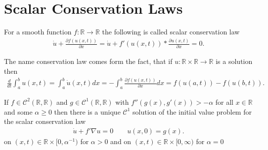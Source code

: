 \section{Scalar Conservation Laws}
\begin{definition}
 For a smooth function $f : \mathbb{R} \to \mathbb{R}$  the following is called scalar conservation law 
 \begin{align*}
  \dot{u} + \frac{\partial f(u(x,t))}{\partial x}   = \dot{u} + f'(u(x,t)) *\frac{\partial u(x,t )}{\partial x}  = 0
 .\end{align*}
\end{definition}
\begin{corollary}
 The name conservation law comes form the fact, that if $u : \mathbb{R} \times  \mathbb{R} \to  \mathbb{R}$   is a solution then 
 \begin{align*}
  \frac{d}{dt} \int_a^{b} u(x,t)  = \int_a^{b} \dot{u}(x,t) dx = -\int_a^{b} \frac{\partial f(u(x,t))}{\partial x}   dx = f(u(a,t)) - f(u(b,t)) 
 .\end{align*}
\end{corollary}
\begin{Theorem}[1.4]
 If $f \in  \mathcal{C}^{2}(\mathbb{R},\mathbb{R}) $  and $g \in  \mathcal{C}^{1}(\mathbb{R},\mathbb{R}) $ with $f''(g(x),g'(x)) > - \alpha $ for all $x \in  \mathbb{R}$
 and some $\alpha  \ge 0$ then there is a unique $\mathcal{C}^{1} $ solution of the initial value problem for the scalar conservation law 
 \begin{align*}
  \dot{u} + f' \nabla u = 0  \qquad u(x,0) = g(x)
 .\end{align*}
 on $(x,t) \in  \mathbb{R} \times  [0,\alpha ^{-1} )$ for $\alpha  > 0 $ and on $(x,t) \in  \mathbb{R} \times  [0,\infty)$ for $\alpha  = 0$
\end{Theorem}
